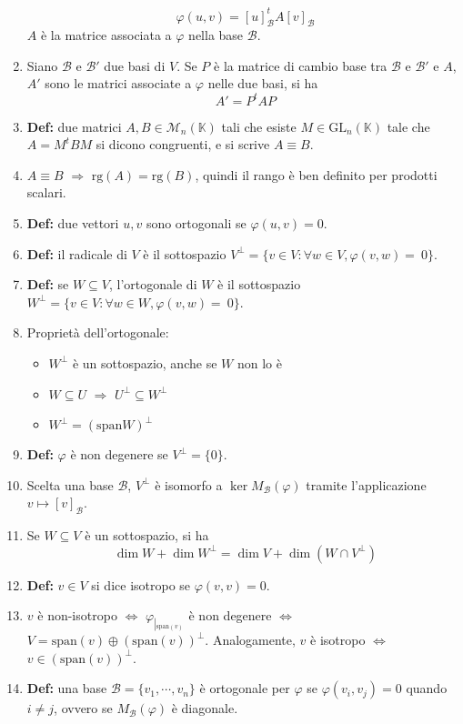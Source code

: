 \documentclass[a4paper,11pt]{article}
\begin{document}
\begin{enumerate}[resume]
	\[\varphi(u,v)=[u]^t_{\mathcal{B}}A[v]_{\mathcal{B}}\]
	$A$ è la matrice associata a $\varphi$ nella base $\mathcal{B}$.
	\item Siano $\mathcal{B}$ e $\mathcal{B}'$ due basi di $V$. Se $P$ è la matrice di cambio base tra $\mathcal{B}$ e $\mathcal{B}'$ e $A$, $A'$ sono le matrici associate a $\varphi$ nelle due basi, si ha
	\[A'=P^tAP\]
	\item\textbf{Def:} due matrici $A,B\in\mathcal{M}_n(\mathbb{K})$ tali che esiste $M\in\textrm{GL}_n(\mathbb{K})$ tale che $A=M^tBM$ si dicono congruenti, e si scrive $A\equiv B$.
	\item $A\equiv B$ $\Rightarrow$ $\textrm{rg}(A)=\textrm{rg}(B)$, quindi il rango è ben definito per prodotti scalari.
	\item \textbf{Def:} due vettori $u,v$ sono ortogonali se $\varphi(u,v)=0$.
	\item\textbf{Def:} il radicale di $V$ è il sottospazio $V^{\perp}=\{v\in V:\forall w\in V,\varphi(v,w)=~0\}$.
	\item\textbf{Def:} se $W\subseteq V$, l'ortogonale di $W$ è il sottospazio $W^{\perp}=\{v\in V:\forall w\in W,\varphi(v,w)=~0\}$.
	\item Proprietà dell'ortogonale:
	\begin{itemize}
		\item $W^{\perp}$ è un sottospazio, anche se $W$ non lo è
		\item $W\subseteq U$ $\Rightarrow$ $U^{\perp}\subseteq W^{\perp}$
		\item $W^{\perp}=(\textrm{span}W)^{\perp}$
	\end{itemize}
	\item\textbf{Def:} $\varphi$ è non degenere se $V^{\perp}=\{0\}$.
	\item Scelta una base $\mathcal{B}$, $V^{\perp}$ è isomorfo a $\ker M_\mathcal{B}(\varphi)$ tramite l'applicazione $v\mapsto[v]_{\mathcal{B}}$.
	\item Se $W\subseteq V$ è un sottospazio, si ha
	\[\dim W+\dim W^{\perp}=\dim V+\dim(W\cap V^{\perp})\]
	\item\textbf{Def:} $v\in V$ si dice isotropo se $\varphi(v,v)=0$.
	\item $v$ è non-isotropo $\Leftrightarrow$ $\varphi_{\left|_{\textrm{span}(v)}\right.}$ è non degenere $\Leftrightarrow$ $V=\textrm{span}(v)\oplus(\textrm{span}(v))^{\perp}$. Analogamente, $v$ è isotropo $\Leftrightarrow$ $v\in(\textrm{span}(v))^{\perp}$.
	\item\textbf{Def:} una base $\mathcal{B}=\{v_1,\cdots,v_n\}$ è ortogonale per $\varphi$ se $\varphi(v_i,v_j)=0$ quando $i\neq j$, ovvero se $M_\mathcal{B}(\varphi)$ è diagonale.

\end{enumerate}
\end{document}
